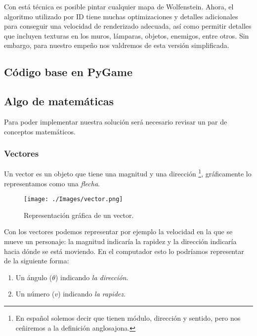Con está técnica es posible pintar cualquier mapa de Wolfenstein. Ahora, el algoritmo utilizado por ID tiene muchas optimizaciones y detalles adicionales para conseguir una velocidad de renderizado adecuada, así como permitir detalles que incluyen texturas en los muros, lámparas, objetos, enemigos, entre otros. Sin embargo, para nuestro empeño nos valdremos de esta versión simplificada.

\newpage
\clearpage

\subsection{Código base en PyGame}




\newpage 
\subsection{Algo de matemáticas}

Para poder implementar nuestra solución será necesario revisar un par de conceptos matemáticos. 

\subsubsection{Vectores}

Un vector es un objeto que tiene una magnitud y una dirección \cite{introVectors} \footnote{En español solemos decir que tienen módulo, dirección y sentido, pero nos ceñiremos a la definición anglosajona.}, gráficamente lo representamos como una \emph{flecha}.
 
 \begin{figure}[h!]
 	\centering
 	\texttt{[image: ./Images/vector.png]}
 	\caption{Representación gráfica de un vector.}
 	\label{vector}
 \end{figure}

Con los vectores podemos representar por ejemplo la velocidad en la que se mueve un personaje: la magnitud indicaría la rapidez y la dirección indicaría hacia dónde se está moviendo. En el computador esto lo podríamos representar de la siguiente forma:

\begin{enumerate}
\item Un ángulo ($\theta$) indicando \emph{la dirección}.

\item Un número ($v$) indicando \emph{la rapidez}.
\end{enumerate}


